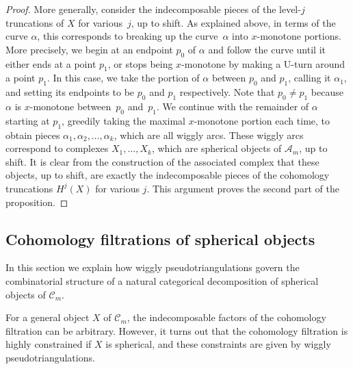 \documentclass{amsart}
\theoremstyle{definition}
\begin{document}
\begin{proof}
  More generally, consider the indecomposable pieces of the level-\(j\) truncations of \(X\) for various~\(j\), up to shift.
  As explained above, in terms of the curve \(\alpha\), this corresponds to breaking up the curve~\(\alpha\) into \(x\)-monotone portions.
  More precisely, we begin at an endpoint \(p_0\) of \(\alpha\) and follow the curve until it either ends at a point \(p_1\), or stops being \(x\)-monotone by making a U-turn around a point \(p_1\).
  In this case, we take the portion of \(\alpha\) between \(p_0\) and \(p_1\), calling it \(\alpha_1\), and setting its endpoints to be \(p_0\) and \(p_1\) respectively.
  Note that \(p_0 \neq p_1\) because \(\alpha\) is \(x\)-monotone between~\(p_0\) and~\(p_1\).
  We continue with the remainder of \(\alpha\) starting at \(p_1\), greedily taking the maximal \(x\)-monotone portion each time, to obtain pieces \(\alpha_1,\alpha_2, \ldots, \alpha_k\), which are all wiggly arcs.
  These wiggly arcs correspond to complexes \(X_1, \ldots, X_k\), which are spherical objects of \(\mathcal{A}_m\), up to shift.
  It is clear from the construction of the associated complex that these objects, up to shift, are exactly the indecomposable pieces of the cohomology truncations \(H^j(X)\) for various \(j\).
  This argument proves the second part of the proposition.
\end{proof}


\subsection{Cohomology filtrations of spherical objects}
\label{subsec:cohomologyFiltrations}

In this section we explain how wiggly pseudotriangulations govern the combinatorial structure of a natural categorical decomposition of spherical objects of \(\mathcal{C}_m\).

For a general object \(X\) of \(\mathcal{C}_m\), the indecomposable factors of the cohomology filtration can be arbitrary.
However, it turns out that the cohomology filtration is highly constrained if \(X\) is spherical, and these constraints are given by wiggly pseudotriangulations.
\end{document}
